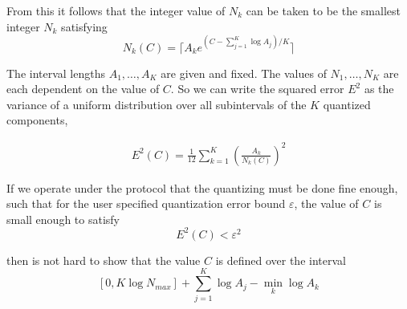 From this it follows that the integer value of $N_k$ can be taken to be
the smallest integer $N_k$ satisfying
\begin{equation}\label{eq:quant-intervals}
N_k(C) = \lceil A_k e^{(C-\sum_{j=1}^K \log A_j)/K} \rceil
\end{equation}

The interval lengths $A_1,\ldots,A_K$ are given and fixed.
The values of $N_1,\ldots,N_K$ are each dependent on the value of $C$.
So we can write the squared error $E^2$ as the variance of a uniform
distribution over all subintervals of the $K$ quantized components,

\begin{eqnarray}\label{eq:sq-quant-error}
E^2(C)=\frac{1}{12}\sum_{k=1}^K \left(\frac{A_k}{N_k(C)}\right)^2
\end{eqnarray}

If we operate under the protocol that the quantizing must be done fine enough,
such that for the user specified quantization error bound $\varepsilon$,
the value of $C$ is small enough to satisfy
\begin{equation}\label{eq:error-condition}
 E^2(C) < \varepsilon^2
\end{equation}

then is not hard to show that the value $C$ is defined over the interval
\[
\left[ 0, K \log N_{max} \right] + \sum_{j=1}^K \log A_j - \min_k \log A_k
\]

